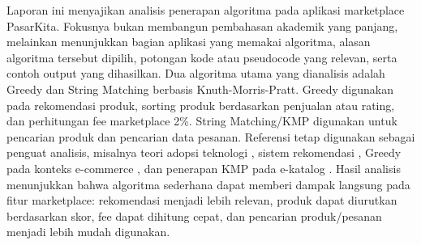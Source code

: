 \begin{summary}
Laporan ini menyajikan analisis penerapan algoritma pada aplikasi marketplace PasarKita. Fokusnya bukan membangun pembahasan akademik yang panjang, melainkan menunjukkan bagian aplikasi yang memakai algoritma, alasan algoritma tersebut dipilih, potongan kode atau pseudocode yang relevan, serta contoh output yang dihasilkan. Dua algoritma utama yang dianalisis adalah Greedy dan String Matching berbasis Knuth-Morris-Pratt. Greedy digunakan pada rekomendasi produk, sorting produk berdasarkan penjualan atau rating, dan perhitungan fee marketplace 2\%. String Matching/KMP digunakan untuk pencarian produk dan pencarian data pesanan. Referensi tetap digunakan sebagai penguat analisis, misalnya teori adopsi teknologi \parencite{Oliveira2011}, sistem rekomendasi \parencite{Resnick1997}, Greedy pada konteks e-commerce \parencite{Tanujaya2026}, dan penerapan KMP pada e-katalog \parencite{Marbun2024}. Hasil analisis menunjukkan bahwa algoritma sederhana dapat memberi dampak langsung pada fitur marketplace: rekomendasi menjadi lebih relevan, produk dapat diurutkan berdasarkan skor, fee dapat dihitung cepat, dan pencarian produk/pesanan menjadi lebih mudah digunakan.
\end{summary}
